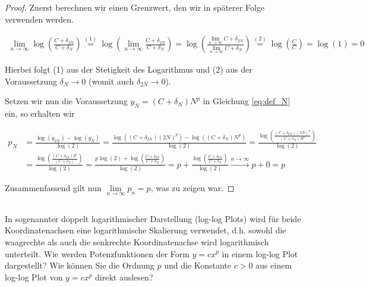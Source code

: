 \documentclass[titlepage]{article}
\begin{document}
\begin{proof}	
	Zuerst berechnen wir einen Grenzwert, den wir in späterer Folge verwenden werden.
	
	
	\begin{align*}
		\lim\limits_{n\rightarrow\infty} \log\left(\frac{C+\delta_{2N}}{C+\delta_N}\right) \stackrel{(1)}{=} \log\left(\lim\limits_{n\rightarrow\infty}\frac{C+\delta_{2N}}{C+\delta_N}\right) = \log\left(\frac{\lim\limits_{n\rightarrow\infty}C+\delta_{2N}}{\lim\limits_{n\rightarrow\infty}C+\delta_N}\right) \stackrel{(2)}{=} \log\left(\frac{C}{C}\right) = \log(1) = 0
	\end{align*}

	Hierbei folgt (1) aus der Stetigkeit des Logarithmus und (2) aus der Voraussetzung $\delta_N\rightarrow 0$ (womit auch $\delta_{2N}\rightarrow 0$).
	
	Setzen wir nun die Voraussetzung $y_N = (C+\delta_N)N^p$ in Gleichung \ref{eq:def_N} ein, so erhalten wir

	\begin{align*}
		p_N &= \frac{\log(y_{2N}) - \log(y_N)}{\log(2)} = \frac{\log((C+\delta_{2N})(2N)^p) - \log((C+\delta_N)N^p)}{\log(2)} = \frac{\log\left(\frac{(C+\delta_{2N})(2N)^p}{(C+\delta_N)N^p}\right)}{\log(2)} \\
		&= \frac{\log\left(\frac{(C+\delta_{2N})2^p}{(C+\delta_N)}\right)}{\log(2)} = \frac{p \log(2) + \log\left(\frac{C+\delta_{2N}}{C+\delta_N}\right)}{\log(2)} = p + \frac{\log\left(\frac{C+\delta_{2N}}{C+\delta_N}\right)}{\log(2)} \xrightarrow{n\rightarrow\infty} p + 0 = p
	\end{align*}
	
	Zusammenfassend gilt nun $\lim\limits_{n\rightarrow\infty}p_n = p$, was zu zeigen war.

\end{proof}


\subsection{}
In sogenannter doppelt logarithmischer Darstellung (log-log Plots) wird für beide Koordinatenachsen eine logarithmische Skalierung verwendet, d.h. sowohl die waagrechte als auch die senkrechte Koordinatenachse wird logarithmisch unterteilt. Wie werden Potenzfunktionen der Form $y = c x^p$ in einem log-log Plot dargestellt? Wie können Sie die Ordnung $p$ und die Konstante $c > 0$ aus einem log-log Plot von $y = cx^p$ direkt auslesen?
\end{document}
